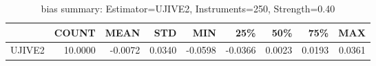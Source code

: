 \begin{table}[ht]
\centering
\caption{bias summary: Estimator=UJIVE2, Instruments=250, Strength=0.40}
\begin{tabular}{lrrrrrrrr}
\toprule
 & COUNT & MEAN & STD & MIN & 25\% & 50\% & 75\% & MAX \\
\midrule
UJIVE2 & 10.0000 & -0.0072 & 0.0340 & -0.0598 & -0.0366 & 0.0023 & 0.0193 & 0.0361 \\
\bottomrule
\end{tabular}
\end{table}
